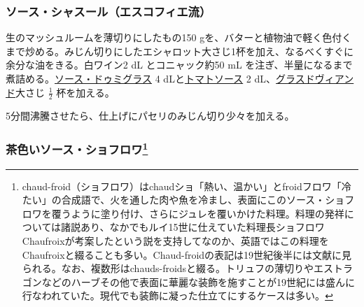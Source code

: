 \begin{recette}
\atoaki{}

\hypertarget{sauce-chasseur-procede-escoffier}{%
\subsubsection{ソース・シャスール（エスコフィエ流）}\label{sauce-chasseur-procede-escoffier}}



生のマッシュルームを薄切りにしたもの150
gを、バターと植物油で軽く色付くまで炒める。みじん切りにしたエシャロット大さじ1杯を加え、なるべくすぐに余分な油をきる。白ワイン2
dL とコニャック約50 mL
を注ぎ、半量になるまで煮詰める。\protect\hyperlink{sauce-demi-glace}{ソース・ドゥミグラス}
4 dLと\protect\hyperlink{sauce-tomate}{トマトソース} 2
dL、\protect\hyperlink{glace-de-viande}{グラスドヴィアンド}大さじ
\(\frac{1}{2}\) 杯を加える。

5分間沸騰させたら、仕上げにパセリのみじん切り少々を加える。

\atoaki{}

\hypertarget{sauce-chaud-froid-brune}{%
\subsubsection[茶色いソース・ショフロワ]{\texorpdfstring{茶色いソース・ショフロワ\footnote{chaud-froid（ショフロワ）はchaudショ「熱い、温かい」とfroidフロワ「冷たい」の合成語で、火を通した肉や魚を冷まし、表面にこのソース・ショフロワを覆うように塗り付け、さらにジュレを覆いかけた料理。料理の発祥については諸説あり、なかでもルイ15世に仕えていた料理長ショフロワChaufroixが考案したという説を支持してなのか、英語ではこの料理をChaufroixと綴ることも多い。Chaud-froidの表記は19世紀後半には文献に見られる。なお、複数形はchauds-froidsと綴る。トリュフの薄切りやエストラゴンなどのハーブその他で表面に華麗な装飾を施すことが19世紀には盛んに行なわれていた。現代でも装飾に凝った仕立てにするケースは多い。}}{茶色いソース・ショフロワ}}\label{sauce-chaud-froid-brune}}


\end{recette}
